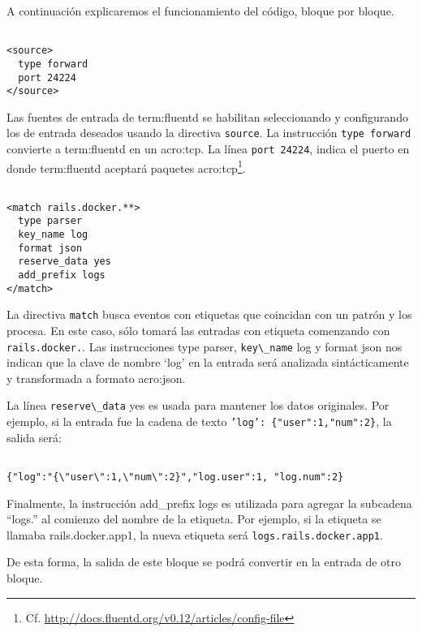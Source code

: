 A continuación explicaremos el funcionamiento del código, bloque por bloque.

\begin{lstlisting}

<source>
  type forward
  port 24224
</source>

\end{lstlisting}

Las fuentes de entrada de \gls{term:fluentd} se habilitan seleccionando y
configurando los  de entrada deseados usando la directiva
\lstinline{source}. La instrucción \lstinline{type forward} convierte a
\gls{term:fluentd} en un  \gls{acro:tcp}. La línea
\lstinline{port 24224}, indica el puerto en donde \gls{term:fluentd} aceptará
paquetes \gls{acro:tcp}\footnote{Cf.
\url{http://docs.fluentd.org/v0.12/articles/config-file}}.

\begin{lstlisting}

<match rails.docker.**>
  type parser
  key_name log
  format json
  reserve_data yes
  add_prefix logs
</match>

\end{lstlisting}

La directiva \lstinline{match} busca eventos con etiquetas que coincidan con un
patrón y los procesa. En este caso, sólo tomará las entradas con etiqueta
comenzando con \lstinline{rails.docker.}. Las instrucciones type parser,
\lstinline{key\_name} log y format json nos indican que la clave de nombre
‘log’ en la entrada será analizada sintácticamente y transformada a formato
\gls{acro:json}.

La línea \lstinline{reserve\_data} yes es usada para mantener los datos
originales. Por ejemplo, si la entrada fue la cadena de texto
\texttt{'log': \{"user":1,"num":2\}}, la salida será:

\begin{lstlisting}

{"log":"{\"user\":1,\"num\":2}","log.user":1, "log.num":2}

\end{lstlisting}

Finalmente, la instrucción add\_prefix logs es utilizada para agregar la
subcadena “logs.” al comienzo del nombre de la etiqueta. Por ejemplo, si la
etiqueta se llamaba rails.docker.app1, la nueva etiqueta será
\lstinline{logs.rails.docker.app1}.

De esta forma, la salida de este bloque se podrá convertir en la entrada de
otro bloque.


